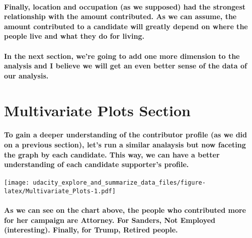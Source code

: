 \documentclass[]{article}
\let\oldparagraph\paragraph
\renewcommand{\paragraph}[1]{\oldparagraph{#1}\mbox{}}
\begin{document}
\paragraph{Finally, location and occupation (as we supposed) had the
strongest relationship with the amount contributed. As we can assume,
the amount contributed to a candidate will greatly depend on where the
people live and what they do for
living.}\label{finally-location-and-occupation-as-we-supposed-had-the-strongest-relationship-with-the-amount-contributed.-as-we-can-assume-the-amount-contributed-to-a-candidate-will-greatly-depend-on-where-the-people-live-and-what-they-do-for-living.}

\paragraph{In the next section, we're going to add one more dimension to
the analysis and I believe we will get an even better sense of the data
of our
analysis.}\label{in-the-next-section-were-going-to-add-one-more-dimension-to-the-analysis-and-i-believe-we-will-get-an-even-better-sense-of-the-data-of-our-analysis.}

\section{Multivariate Plots Section}\label{multivariate-plots-section}

\paragraph{To gain a deeper understanding of the contributor profile (as
we did on a previous section), let's run a similar analaysis but now
faceting the graph by each candidate. This way, we can have a better
understanding of each candidate supporter's
profile.}\label{to-gain-a-deeper-understanding-of-the-contributor-profile-as-we-did-on-a-previous-section-lets-run-a-similar-analaysis-but-now-faceting-the-graph-by-each-candidate.-this-way-we-can-have-a-better-understanding-of-each-candidate-supporters-profile.}

\texttt{[image: udacity\_explore\_and\_summarize\_data\_files/figure-latex/Multivariate\_Plots-1.pdf]}

\paragraph{As we can see on the chart above, the people who contributed
more for her campaign are Attorney. For Sanders, Not Employed
(interesting). Finally, for Trump, Retired
people.}\label{as-we-can-see-on-the-chart-above-the-people-who-contributed-more-for-her-campaign-are-attorney.-for-sanders-not-employed-interesting.-finally-for-trump-retired-people.}
\end{document}
